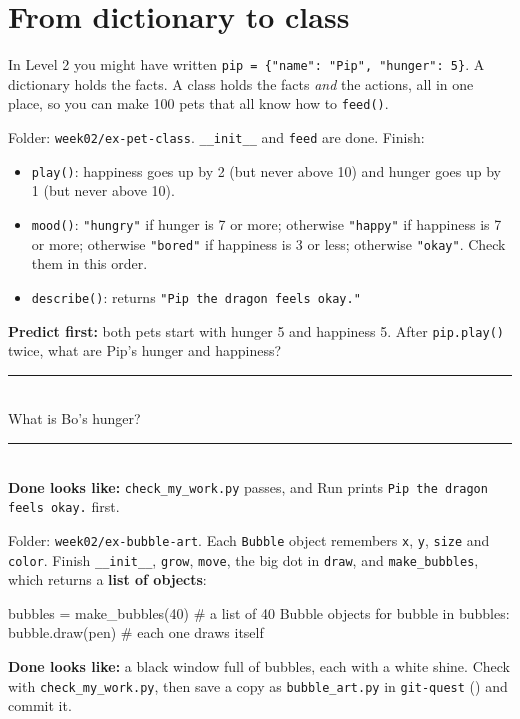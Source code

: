 \section{From dictionary to class}
In Level 2 you might have written \texttt{pip = \{"name": "Pip", "hunger": 5\}}. A dictionary holds the facts. A class holds the facts \emph{and} the actions, all in one place, so you can make 100 pets that all know how to \texttt{feed()}.

\begin{exercise}
Folder: \texttt{week02/ex-pet-class}. \texttt{\_\_init\_\_} and \texttt{feed} are done. Finish:
\begin{itemize}[itemsep=1pt]
  \item \texttt{play()}: happiness goes up by 2 (but never above 10) and hunger goes up by 1 (but never above 10).
  \item \texttt{mood()}: \texttt{"hungry"} if hunger is 7 or more; otherwise \texttt{"happy"} if happiness is 7 or more; otherwise \texttt{"bored"} if happiness is 3 or less; otherwise \texttt{"okay"}. Check them in this order.
  \item \texttt{describe()}: returns \texttt{"Pip the dragon feels okay."}
\end{itemize}
\textbf{Predict first:} both pets start with hunger 5 and happiness 5. After \texttt{pip.play()} twice, what are Pip's hunger and happiness? \rule{4cm}{0.4pt}\\
What is Bo's hunger? \rule{3cm}{0.4pt}\\
\textbf{Done looks like:} \texttt{check\_my\_work.py} passes, and Run prints \texttt{Pip the dragon feels okay.} first.
\end{exercise}

\begin{exercise}
Folder: \texttt{week02/ex-bubble-art}. Each \texttt{Bubble} object remembers \texttt{x}, \texttt{y}, \texttt{size} and \texttt{color}. Finish \texttt{\_\_init\_\_}, \texttt{grow}, \texttt{move}, the big dot in \texttt{draw}, and \texttt{make\_bubbles}, which returns a \textbf{list of objects}:
\begin{pycode}
bubbles = make_bubbles(40)     # a list of 40 Bubble objects
for bubble in bubbles:
    bubble.draw(pen)           # each one draws itself
\end{pycode}
\textbf{Done looks like:} a black window full of bubbles, each with a white shine. Check with \texttt{check\_my\_work.py}, then save a copy as \texttt{bubble\_art.py} in \texttt{git-quest} () and commit it.
\end{exercise}

